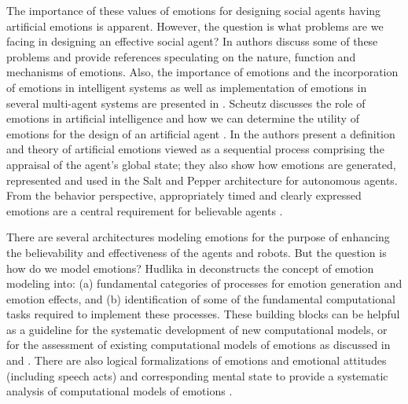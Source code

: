 \documentclass[12pt]{report}
\begin{document}
The importance of these values of emotions for designing social agents having
artificial emotions is apparent. However, the question is what problems are we
facing in designing an effective social agent? In
\cite{freitas:artificial-emotions-ready} authors discuss some of these problems
and provide references speculating on the nature, function and mechanisms of
emotions. Also, the importance of emotions and the incorporation of emotions in
intelligent systems as well as implementation of emotions in several multi-agent
systems are presented in \cite{miranda:emotions-humans-ai}. Scheutz discusses
the role of emotions in artificial intelligence and how we can determine the
utility of emotions for the design of an artificial agent
\cite{scheutz:emotion-role}. In \cite{botelho:machinery-emotions} the authors
present a definition and theory of artificial emotions viewed as a sequential
process comprising the appraisal of the agent's global state; they also show how
emotions are generated, represented and used in the Salt and Pepper architecture
for autonomous agents. From the behavior perspective, appropriately timed and
clearly expressed emotions are a central requirement for believable agents
\cite{bates:emotion-roles}.

There are several architectures modeling emotions for the purpose of enhancing
the believability and effectiveness of the agents and robots. But the question
is how do we model emotions? Hudlika in \cite{hudlicka:modeling-emotion}
deconstructs the concept of emotion modeling into: (a) fundamental categories
of processes for emotion generation and emotion effects, and (b) identification
of some of the fundamental computational tasks required to implement these
processes. These building blocks can be helpful as a guideline for the
systematic development of new computational models, or for the assessment of
existing computational models of emotions as discussed in
\cite{lin:computational-models-emotion} and \cite{marsella:computational}. There
are also logical formalizations of emotions and emotional attitudes (including
speech acts) and corresponding mental state to provide a systematic analysis
of computational models of emotions \cite{adam:logical-formalization,
grant:model-intention-formation, guiraud:emotions-formalization-speech-acts}.
\end{document}
